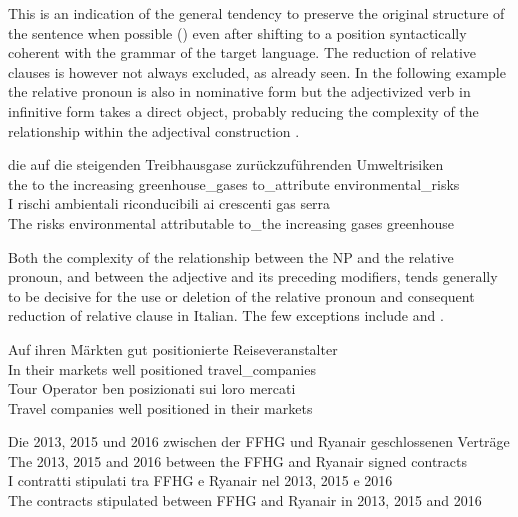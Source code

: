 \documentclass[output=paper,colorlinks,citecolor=brown]{langscibook}
\begin{document}
This is an indication of the general tendency to preserve the original structure of the sentence when possible (\citealt{CardinalettiGarzone2005}) even after shifting to a position syntactically coherent with the grammar of the target language. The reduction of relative clauses is however not always excluded, as already seen. In the following example the relative pronoun is also in nominative form but the adjectivized verb in infinitive form takes a direct object, probably reducing the complexity of the relationship within the adjectival construction .

\ea%
    \label{ex:resi:49}
\ea
\gll  die  auf  die  steigenden  Treibhausgase  zurückzuführenden  Umweltrisiken \\
    the  to  the  increasing  greenhouse\_gases  to\_attribute  environmental\_risks   \\
\ex
\gll I  rischi  ambientali  riconducibili  ai  crescenti  gas serra\\
  The  risks  environmental  attributable  to\_the  increasing   gases greenhouse\\
\z
\z

Both the complexity of the relationship between the NP and the relative pronoun, and between the adjective and its preceding modifiers, tends generally to be decisive for the use or deletion of the relative pronoun and consequent reduction of relative clause in Italian. The few exceptions include  and .

\ea%
    \label{ex:resi:50}
\ea
\gll  Auf  ihren  Märkten  gut  positionierte  Reiseveranstalter \\
    In  their  markets  well  positioned  travel\_companies   \\
\ex
 \gll  Tour Operator  ben  posizionati  sui  loro  mercati\\
  Travel companies  well  positioned  in  their  markets\\
\z
\z

\ea%
    \label{ex:resi:51}
\ea
\gll  Die 2013,  2015  und  2016  zwischen  der  FFHG  und  Ryanair   geschlossenen  Verträge   \\
   The  2013,  2015  and  2016  between    the FFHG  and  Ryanair    signed contracts       \\

\ex
\gll   I  contratti  stipulati     tra  FFHG  e  Ryanair    nel  2013,  2015  e  2016     \\
       The  contracts  stipulated  between  FFHG  and  Ryanair  in  2013,  2015  and  2016       \\
       \z
\z
\end{document}
